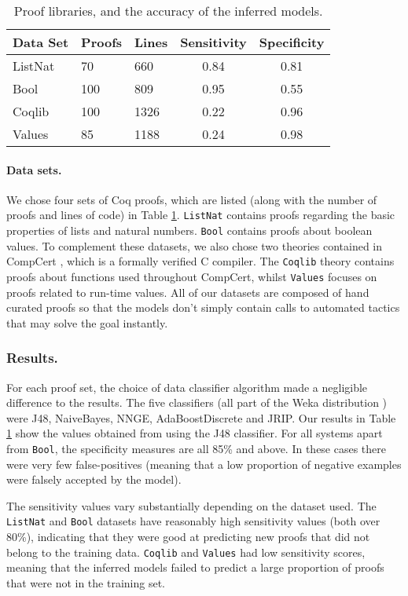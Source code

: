 \documentclass{llncs}
\begin{document}
\begin{table}[t]
\centering
\caption{Proof libraries, and the accuracy of the inferred models.}
\begin{tabular}{lll|cc}
\hline
Data Set & Proofs & Lines & Sensitivity & Specificity \\
\hline
ListNat & 70 & 660 & 0.84  & 0.81 \\
Bool & 100 & 809 & 0.95  & 0.55 \\
Coqlib & 100 & 1326 & 0.22  & 0.96 \\
Values & 85 & 1188 & 0.24  & 0.98 \\
\hline
\end{tabular}
\label{tab:datasets}
\end{table}

\paragraph{Data sets.} We chose four sets of Coq proofs, which are listed (along with the number of proofs and lines of code) in Table \ref{tab:datasets}. \texttt{ListNat} contains proofs regarding the basic properties of lists and natural numbers. \texttt{Bool} contains proofs about boolean values. To complement these datasets, we also chose two theories contained in CompCert \cite{Leroy09}, which is a formally verified C compiler. The \texttt{Coqlib} theory contains proofs about functions used throughout CompCert, whilst \texttt{Values} focuses on proofs related to run-time values. All of our datasets are composed of hand curated proofs so that the models don't simply contain calls to automated tactics that may solve the goal instantly.

\subsubsection{Results.}
For each proof set, the choice of data classifier algorithm made a negligible difference to the results. The five classifiers (all part of the Weka distribution \cite{Weka09}) were J48, NaiveBayes, NNGE, AdaBoostDiscrete and JRIP. Our results in Table \ref{tab:datasets} show the values obtained from using the J48 classifier. For all systems apart from \texttt{Bool}, the specificity measures are all 85\% and above. In these cases there were very few false-positives (meaning that a low proportion of negative examples were falsely accepted by the model).

The sensitivity values vary substantially depending on the dataset used. The \texttt{ListNat} and \texttt{Bool} datasets have reasonably high sensitivity values (both over 80\%), indicating that they were good at predicting new proofs that did not belong to the training data. \texttt{Coqlib} and \texttt{Values} had low sensitivity scores, meaning that the inferred models failed to predict a large proportion of proofs that were not in the training set. 
\end{document}
